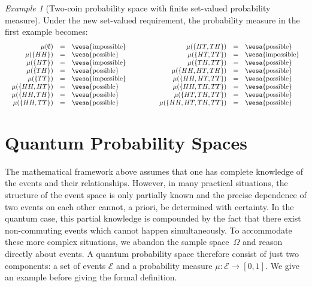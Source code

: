 \documentclass{article}
\theoremstyle{remark}
\newtheorem{example}{Example}
\newcommand{\qevents}{\ensuremath{\mathcal{E}}}
\newcommand{\pmeas}{\ensuremath{\mu}}
\newcommand{\poss}{{\mbox{\wesa{possible}}}}
\newcommand{\imposs}{{\mbox{\wesa{impossible}}}}
\begin{document}
\begin{example}[Two-coin probability space with finite set-valued
  probability measure] Under the new set-valued requirement, the
  probability measure in the first example becomes:
\[\begin{array}{c@{\qquad\qquad}c}
\begin{array}{rcl}
\pmeas(\emptyset) &=& \imposs \\
\pmeas(\{ HH \}) &=& \poss \\
\pmeas(\{ HT \}) &=& \imposs \\
\pmeas(\{ TH \}) &=& \poss \\
\pmeas(\{ TT \}) &=& \imposs \\
\pmeas(\{  HH, HT \}) &=& \poss \\
\pmeas(\{  HH, TH \}) &=& \poss \\
\pmeas(\{  HH , TT \}) &=& \poss \\
\end{array} & \begin{array}{rcl}
\pmeas(\{  HT, TH \}) &=& \poss \\
\pmeas(\{  HT , TT \}) &=& \imposs \\
\pmeas(\{  TH , TT \}) &=& \poss \\
\pmeas(\{  HH, HT, TH \}) &=& \poss \\
\pmeas(\{  HH, HT, TT \}) &=& \poss \\
\pmeas(\{  HH, TH, TT \}) &=& \poss \\
\pmeas(\{  HT, TH, TT \}) &=& \poss \\
\pmeas(\{  HH, HT, TH, TT \}) &=& \poss 
\end{array}
\end{array}\]
\end{example}

\section{Quantum Probability Spaces}

The mathematical framework above assumes that one has complete
knowledge of the events and their relationships. However, in many
practical situations, the structure of the event space is only
partially known and the precise dependence of two events on each other
cannot, a priori, be determined with certainty. In the quantum case,
this partial knowledge is compounded by the fact that there exist
non-commuting events which cannot happen simultaneously. To
accommodate these more complex situations, we abandon the sample
space~$\Omega$ and reason directly about events. A quantum probability
space therefore consist of just two components: a set of events
$\qevents$ and a probability measure
$\mu : \qevents \rightarrow [0,1]$. We give an example before giving
the formal definition.
\end{document}
